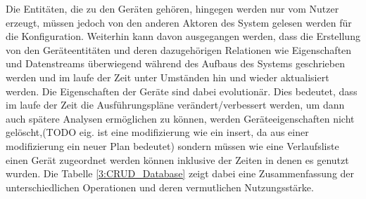 Die Entitäten, die zu den Geräten gehören, hingegen werden nur vom Nutzer erzeugt, müssen jedoch von den anderen Aktoren des System gelesen werden für die Konfiguration. 
Weiterhin kann davon ausgegangen werden, dass die Erstellung von den Geräteentitäten und deren dazugehörigen Relationen wie Eigenschaften und Datenstreams überwiegend während des Aufbaus des Systems geschrieben werden und im laufe der Zeit unter Umständen hin und wieder aktualisiert werden. Die Eigenschaften der Geräte sind dabei evolutionär. Dies bedeutet, dass im laufe der Zeit die Ausführungspläne verändert/verbessert werden, um dann auch spätere Analysen ermöglichen zu können, werden Geräteeigenschaften nicht gelöscht,(TODO eig. ist eine modifizierung wie ein insert, da aus einer modifizierung ein neuer Plan bedeutet) sondern müssen wie eine Verlaufsliste einen Gerät zugeordnet werden können inklusive der Zeiten in denen es genutzt wurden.
Die Tabelle \ref{3:CRUD_Database} zeigt dabei eine Zusammenfassung der unterschiedlichen Operationen und deren vermutlichen Nutzungsstärke.

